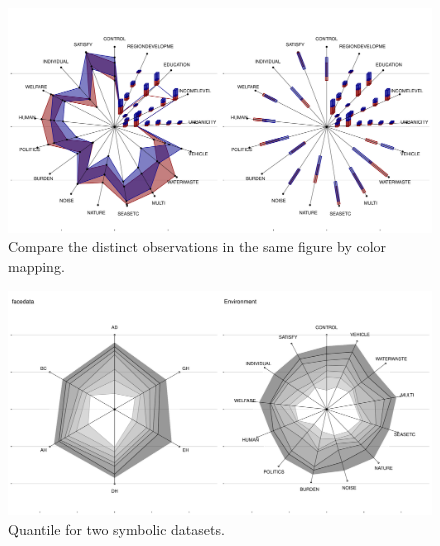 \documentclass[article]{jss}
\begin{document}
\begin{appendix}
\begin{figure}[t!]
\centering
\includegraphics[width=1\textwidth]{pic/radar} 
\caption{\label{fig:radar}  Compare the distinct observations in the same figure by color mapping.}
\end{figure}



\begin{figure}[t!]
\centering
\includegraphics[width=1\textwidth]{pic/radar_2datasets} 
\caption{\label{fig:quantile2} Quantile for two symbolic datasets.}
\end{figure}




\end{appendix}
\end{document}
